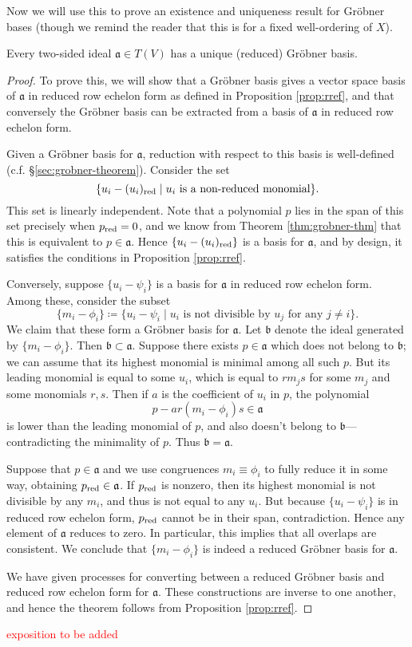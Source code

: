 Now we will use this to prove an existence and uniqueness result for Gr\"obner bases (though we remind the reader that this is for a fixed well-ordering of $X$).
\begin{thm}\label{thm:exist+unique}
	Every two-sided ideal $\mathfrak{a}\in T(V)$ has a unique (reduced) Gr\"obner basis.
\end{thm}
\begin{proof}
	To prove this, we will show that a Gr\"obner basis gives a vector space basis of $\mathfrak{a}$ in reduced row echelon form as defined in Proposition \ref{prop:rref}, and that conversely the Gr\"obner basis can be extracted from a basis of $\mathfrak{a}$ in reduced row echelon form.
	
	Given a Gr\"obner basis for $\mathfrak{a}$, reduction with respect to this basis is well-defined (c.f. \S\ref{sec:grobner-theorem}). Consider the set
	\[
		\{u_i - (u_i)_{\mathrm{red}} \mid u_i \text{ is a non-reduced monomial}\}.
	\]
	This set is linearly independent. Note that a polynomial $p$ lies in the span of this set precisely when $p_{\mathrm{red}} = 0$, and we know from Theorem \ref{thm:grobner-thm} that this is equivalent to $p \in \mathfrak{a}$. Hence $\{u_i - (u_i)_{\mathrm{red}}\}$ is a basis for $\mathfrak{a}$, and by design, it satisfies the conditions in Proposition \ref{prop:rref}.
	
	Conversely, suppose $\{u_i - \psi_i\}$ is a basis for $\mathfrak{a}$ in reduced row echelon form. Among these, consider the subset
	\[
		\{m_i - \phi_i\} \coloneqq \{u_i - \psi_i \mid u_i \text{ is not divisible by } u_j \text{ for any }j\neq i\}.
	\]
	We claim that these form a Gr\"obner basis for $\mathfrak{a}$. Let $\mathfrak{b}$ denote the ideal generated by $\{m_i -\phi_i\}$. Then $\mathfrak{b} \subset \mathfrak{a}$. Suppose there exists $p\in \mathfrak{a}$ which does not belong to $\mathfrak{b}$; we can assume that its highest monomial is minimal among all such $p$. But its leading monomial is equal to some $u_i$, which is equal to $rm_j s$ for some $m_j$ and some monomials $r,s$. Then if $a$ is the coefficient of $u_i$ in $p$, the polynomial
	\[
		p - ar(m_i -\phi_i)s \in \mathfrak{a}
	\]
	is lower than the leading monomial of $p$, and also doesn't belong to $\mathfrak{b}$---contradicting the minimality of $p$. Thus $\mathfrak{b} = \mathfrak{a}$.
	
	Suppose that $p\in \mathfrak{a}$ and we use congruences $m_i \equiv \phi_i$ to fully reduce it in some way, obtaining $p_{\mathrm{red}} \in \mathfrak{a}$. If $p_{\mathrm{red}}$ is nonzero, then its highest monomial is not divisible by any $m_i$, and thus is not equal to any $u_i$. But because $\{u_i - \psi_i\}$ is in reduced row echelon form, $p_{\mathrm{red}}$ cannot be in their span, contradiction. Hence any element of $\mathfrak{a}$ reduces to zero. In particular, this implies that all overlaps are consistent. We conclude that $\{m_i - \phi_i\}$ is indeed a reduced Gr\"obner basis for $\mathfrak{a}$.
	
	We have given processes for converting between a reduced Gr\"obner basis and reduced row echelon form for $\mathfrak{a}$. These constructions are inverse to one another, and hence the theorem follows from Proposition \ref{prop:rref}.
\end{proof}
\textcolor{red}{exposition to be added}